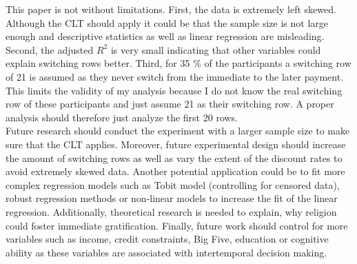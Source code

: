 \documentclass[10pt,a4paper]{article}
\begin{document}
This paper is not without limitations. First, the data is extremely left skewed. Although the CLT should apply it could be that the sample size is not large enough and descriptive statistics as well as linear regression are misleading. Second, the adjusted $R^2$ is very small indicating that other variables could explain switching rows better. %
Third, for 35 \% of the participants a switching row of 21 is assumed as they never switch from the immediate to the later payment. This limits the validity of my analysis because I do not know the real switching row of these participants and just assume 21 as their switching row. A proper analysis should therefore just analyze the first 20 rows.\\
Future research should conduct the experiment with a larger sample size to make sure that the CLT applies. Moreover, future experimental design should increase the amount of switching rows as well as vary the extent of the discount rates to avoid extremely skewed data. Another potential application could be to fit more complex regression models such as Tobit model (controlling for censored data), robust regression methods or non-linear models to increase the fit of the linear regression. Additionally, theoretical research is needed to explain, why religion could foster immediate gratification. Finally, future work should control for more variables such as income, credit constraints, Big Five, education or cognitive ability as these variables are associated with intertemporal decision making. 


\newpage
\printbibliography
\end{document}
